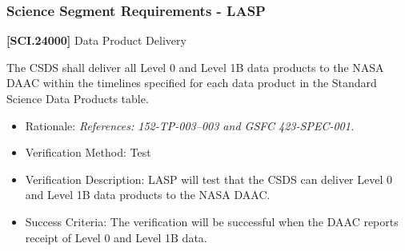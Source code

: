 \documentclass[12pt,oneside,oldfontcommands]{memoir}
\begin{document}
\subsubsection{Science Segment Requirements - LASP}
\label{sciencesegmentrequirements-lasp}

\textbf{[SCI.24000]} Data Product Delivery

The \gls{CSDS} shall deliver all Level 0 and Level 1B data products to the NASA \gls{DAAC} within the timelines specified for each data product in the Standard Science Data Products table.

\begin{itemize}
\item{} Rationale: \emph{References: 152-TP-003--003 and GSFC 423-SPEC-001.}

\item{} Verification Method: Test

\item{} Verification Description: \gls{LASP} will \gls{test} that the \gls{CSDS} can deliver Level 0 and Level 1B data products to the NASA \gls{DAAC}.

\item{} Success Criteria: The verification will be successful when the \gls{DAAC} reports receipt of Level 0 and Level 1B data.

\end{itemize}
\end{document}
